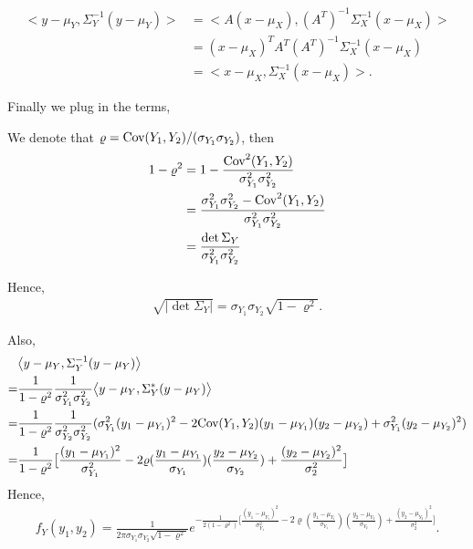 {\begin{align*}
    \big<y-\mu_Y,\Sigma_Y^{-1}(y-\mu_Y)\big>&=\big<A(x-\mu_X),(A^T)^{-1}\Sigma_X^{-1}(x-\mu_X)\big>\\
    &=(x-\mu_X)^TA^T(A^T)^{-1}\Sigma_X^{-1}(x-\mu_X)\\
    &=\big<x-\mu_X,\Sigma_X^{-1}(x-\mu_X)\big>.
\end{align*}

Finally we plug in the terms,

\item
We denote that $\varrho=\text{Cov}(Y_1,Y_2)/(\sigma_{Y_1}\sigma_{Y_2})$, then
\begin{align*}
    1-\varrho^2&=1-\frac{\text{Cov}^2(Y_1,Y_2)}{\sigma_{Y_1}^2\sigma_{Y_2}^2}\\
    &=\frac{\sigma_{Y_1}^2\sigma_{Y_2}^2-\text{Cov}^2(Y_1,Y_2)}{\sigma_{Y_1}^2\sigma_{Y_2}^2}\\
    &=\frac{\det\Sigma_Y}{\sigma_{Y_1}^2\sigma_{Y_2}^2}
\end{align*}

Hence,
\begin{align*}
    \sqrt{|\det\Sigma_Y|}=\sigma_{Y_1}\sigma_{Y_2}\sqrt{1-\varrho^2}.
\end{align*}

Also,
\begin{align*}
    &\big<y-\mu_Y,\Sigma_Y^{-1}(y-\mu_Y)\big>\\
    =&\frac{1}{1-\varrho^2}\frac{1}{\sigma_{Y_1}^2\sigma_{Y_2}^2}\big<y-\mu_Y,\Sigma_Y^*(y-\mu_Y)\big>\\
    =&\frac{1}{1-\varrho^2}\frac{1}{\sigma_{Y_2}^2\sigma_{Y_2}^2}(\sigma_{Y_1}^2(y_1-\mu_{Y_1})^2-2\text{Cov}(Y_1,Y_2)(y_1-\mu_{Y_1})(y_2-\mu_{Y_2})+\sigma_{Y_1}^2(y_2-\mu_{Y_2})^2)\\
    =&\frac{1}{1-\varrho^2}\big[\frac{(y_1-\mu_{Y_1})^2}{\sigma_{Y_1}^2}-2\varrho(\frac{y_1-\mu_{Y_1}}{\sigma_{Y_1}})(\frac{y_2-\mu_{Y_2}}{\sigma_{Y_2}})+\frac{(y_2-\mu_{Y_2})^2}{\sigma_2^2}\big]
\end{align*}
Hence,
\begin{align*}
    f_Y(y_1,y_2)=\frac{1}{2\pi\sigma_{Y_1}\sigma_{Y_2}\sqrt{1-\varrho^2}}e^{-\frac{1}{2(1-\varrho^2)}\big[\frac{(y_1-\mu_{Y_1})^2}{\sigma_{Y_1}^2}-2\varrho(\frac{y_1-\mu_{Y_1}}{\sigma_{Y_1}})(\frac{y_2-\mu_{Y_2}}{\sigma_{Y_2}})+\frac{(y_2-\mu_{Y_2})^2}{\sigma_2^2}\big]}.
\end{align*}

}

